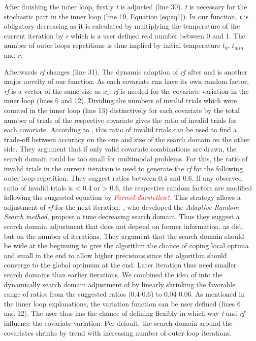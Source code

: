 After finishing the inner loop, firstly \textit{t} is adjusted (line 30). \textit{t} is necessary for the stochastic part in the inner loop (line 19, Equation \ref{eq:eq1}). In our function, \textit{t} is obligatory decreasing as it is calculated by multiplying the temperature of the current iteration by \textit{r} which is a user defined real number between 0 and 1. The number of outer loops repetitions is thus implied by initial temperature $t_0$, $t_{min}$ and \textit{r}.

Afterwards \textit{rf} changes (line 31). The dynamic adaption of \textit{rf} after \citet{corana_1987} and \citet{pronzato_1984} is another major novelty of our function. As each covariate can have its own random factor, \textit{rf} is a vector of the same size as $x_i$. \textit{rf} is needed for the covariate variation in the inner loop (lines 6 and 12). Dividing the numbers of invalid trials which were counted in the inner loop (line 13) distinctively for each covariate by the total number of trials of the respective covariate gives the ratio of invalid trials for each covariate. According to \citep{corana_1987}, this ratio of invalid trials can be used to find a trade-off between accuracy on the one and size of the search domain on the other side. They argument that if only valid covariate combinations are drawn, the search domain could be too small for multimodal problems. For this, the ratio of invalid trials in the current iteration is used to generate the \textit{rf} for the following outer loop repetition. They suggest ratios between 0.4 and 0.6. If any observed ratio of invalid trials is < 0.4 or > 0.6, the respective random factors are modified following the suggested equation by \citet{corana_1987} \textcolor{red}{\textit{Formel darstellen?}}. This strategy allows a adjustment of \textit{rf} for the next iteration. \citet{pronzato_1984}, who developed the \emph{Adaptive Random Search method}, propose a time decreasing search domain. Thus they suggest a search domain adjustment that does not depend on former information, as \citet{corana_1987} did, but on the number of iterations. They argument that the search domain should be wide at the beginning to give the algorithm the chance of coping local optima and small in the end to allow higher precisions since the algorithm should converge to the global optimum at the end. Later iteration thus need smaller search domains than earlier iterations. We combined the idea of \citet{pronzato_1984} into the dynamically search domain adjustment of \citep{corana_1987} by linearly shrinking the favorable range of ratios from the suggested ratios (0.4-0.6) to 0.04-0.06. As mentioned in the inner loop explanations, the variation function can be user defined (lines 6 and 12). The user thus has the chance of defining flexibly in which way \textit{t} and \textit{rf} influence the covariate variation. Per default, the search domain around the covariates shrinks by trend with increasing number of outer loop iterations.

